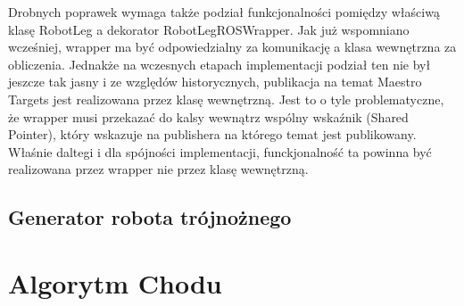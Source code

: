 \documentclass[a4paper,13pt]{article}
\begin{document}
Drobnych poprawek wymaga także podział funkcjonalności pomiędzy właściwą klasę RobotLeg a dekorator RobotLegROSWrapper. Jak już wspomniano wcześniej, wrapper ma być odpowiedzialny za komunikację a klasa wewnętrzna za obliczenia. Jednakże na wczesnych etapach implementacji podział ten nie był jeszcze tak jasny i ze względów historycznych, publikacja na temat Maestro Targets jest realizowana przez klasę wewnętrzną. Jest to o tyle problematyczne, że wrapper musi przekazać do kalsy wewnątrz wspólny wskaźnik (Shared Pointer), który wskazuje na publishera na którego temat jest publikowany. Właśnie daltegi i dla spójności implementacji, funckjonalność ta powinna być realizowana przez wrapper nie przez klasę wewnętrzną.\\



\subsection{Generator robota trójnożnego}

\section{Algorytm Chodu}
\end{document}
